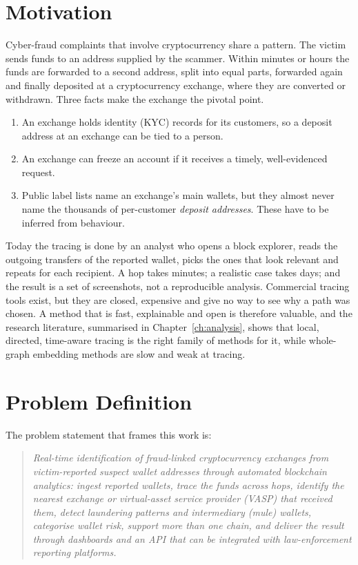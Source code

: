 \section{Motivation}
Cyber-fraud complaints that involve cryptocurrency share a pattern. The victim sends funds to an address supplied by the scammer. Within minutes or hours the funds are forwarded to a second address, split into equal parts, forwarded again and finally deposited at a cryptocurrency exchange, where they are converted or withdrawn. Three facts make the exchange the pivotal point.
\begin{enumerate}
\item An exchange holds identity (KYC) records for its customers, so a deposit address at an exchange can be tied to a person.
\item An exchange can freeze an account if it receives a timely, well-evidenced request.
\item Public label lists name an exchange's main wallets, but they almost never name the thousands of per-customer \emph{deposit addresses}. These have to be inferred from behaviour.
\end{enumerate}
Today the tracing is done by an analyst who opens a block explorer, reads the outgoing transfers of the reported wallet, picks the ones that look relevant and repeats for each recipient. A hop takes minutes; a realistic case takes days; and the result is a set of screenshots, not a reproducible analysis. Commercial tracing tools exist, but they are closed, expensive and give no way to see why a path was chosen. A method that is fast, explainable and open is therefore valuable, and the research literature, summarised in Chapter~\ref{ch:analysis}, shows that local, directed, time-aware tracing is the right family of methods for it, while whole-graph embedding methods are slow and weak at tracing.

\section{Problem Definition}
\label{sec:problem}
The problem statement that frames this work is:

\begin{quote}\itshape
Real-time identification of fraud-linked cryptocurrency exchanges from victim-reported suspect wallet addresses through automated blockchain analytics: ingest reported wallets, trace the funds across hops, identify the nearest exchange or virtual-asset service provider (VASP) that received them, detect laundering patterns and intermediary (mule) wallets, categorise wallet risk, support more than one chain, and deliver the result through dashboards and an API that can be integrated with law-enforcement reporting platforms.
\end{quote}

